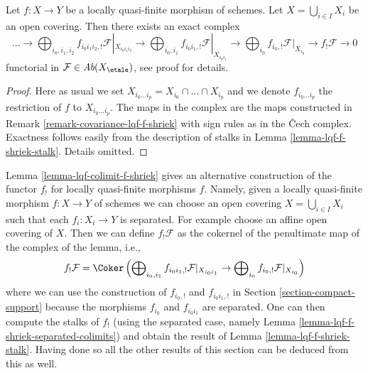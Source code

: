 \begin{lemma}
\label{lemma-lqf-colimit-f-shriek}
Let $f : X \to Y$ be a locally quasi-finite morphism of schemes.
Let $X = \bigcup_{i \in I} X_i$ be an open covering. Then there
exists an exact complex
$$
\ldots \to
\bigoplus\nolimits_{i_0, i_1, i_2} f_{i_0i_1i_2, !}
\mathcal{F}|_{X_{i_0i_1i_2}} \to
\bigoplus\nolimits_{i_0, i_1} f_{i_0i_1, !} \mathcal{F}|_{X_{i_0i_1}} \to
\bigoplus\nolimits_{i_0} f_{i_0, !} \mathcal{F}|_{X_{i_0}}
\to f_!\mathcal{F} \to 0
$$
functorial in $\mathcal{F} \in \textit{Ab}(X_\etale)$, see
proof for details.
\end{lemma}

\begin{proof}
Here as usual we set $X_{i_0 \ldots i_p} = X_{i_0} \cap \ldots \cap X_{i_p}$
and we denote $f_{i_0 \ldots i_p}$ the restriction of $f$ to
$X_{i_0 \ldots i_p}$. The maps in the complex are the maps
constructed in Remark \ref{remark-covariance-lqf-f-shriek}
with sign rules as in the {\v C}ech complex.
Exactness follows easily from the description of stalks in
Lemma \ref{lemma-lqf-f-shriek-stalk}. Details omitted.
\end{proof}

\begin{remark}
\label{remark-alternative-lqf-f-shriek}
Lemma \ref{lemma-lqf-colimit-f-shriek}
gives an alternative construction of the functor $f_!$
for locally quasi-finite morphisms $f$.
Namely, given a locally quasi-finite morphism $f : X \to Y$ of schemes
we can choose an open covering $X = \bigcup_{i \in I} X_i$
such that each $f_i : X_i \to Y$ is separated. For example choose
an affine open covering of $X$. Then we
can define $f_!\mathcal{F}$ as the cokernel of the penultimate map
of the complex of the lemma, i.e.,
$$
f_!\mathcal{F} = \Coker\left(
\bigoplus\nolimits_{i_0, i_1} f_{i_0i_1, !} \mathcal{F}|_{X_{i_0i_1}} \to
\bigoplus\nolimits_{i_0} f_{i_0, !} \mathcal{F}|_{X_{i_0}}
\right)
$$
where we can use the construction of $f_{i_0, !}$ and
$f_{i_0i_1, !}$ in Section \ref{section-compact-support}
because the morphisms $f_{i_0}$ and $f_{i_0 i_1}$ are separated.
One can then compute the stalks of $f_!$ (using the separated
case, namely Lemma \ref{lemma-lqf-f-shriek-separated-colimits})
and obtain the result of Lemma \ref{lemma-lqf-f-shriek-stalk}.
Having done so all the other results of this section can be
deduced from this as well.
\end{remark}

